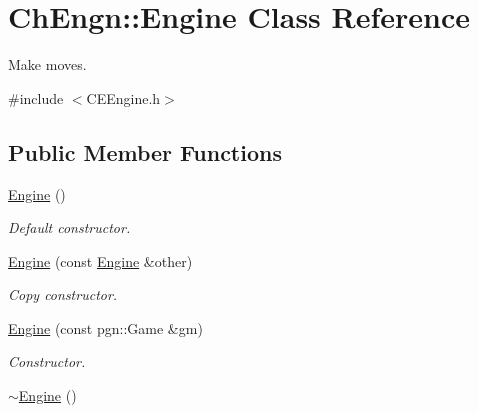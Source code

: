 \hypertarget{classChEngn_1_1Engine}{
\section{ChEngn::Engine Class Reference}
\label{classChEngn_1_1Engine}
}


Make moves.  




{\ttfamily \#include $<$CEEngine.h$>$}

\subsection*{Public Member Functions}
\begin{DoxyCompactItemize}
\item 
\hypertarget{classChEngn_1_1Engine_a2bd4b075e86d94d94f3ea97c680b302e}{
\hyperlink{classChEngn_1_1Engine_a2bd4b075e86d94d94f3ea97c680b302e}{Engine} ()}
\label{classChEngn_1_1Engine_a2bd4b075e86d94d94f3ea97c680b302e}

\begin{DoxyCompactList}\small\item\em Default constructor. \item\end{DoxyCompactList}\item 
\hyperlink{classChEngn_1_1Engine_ab92c015fc819dc2b7c51cccbc7878002}{Engine} (const \hyperlink{classChEngn_1_1Engine}{Engine} \&other)
\begin{DoxyCompactList}\small\item\em Copy constructor. \item\end{DoxyCompactList}\item 
\hyperlink{classChEngn_1_1Engine_a1184e133eae1f7e23bf405302fa9f53c}{Engine} (const pgn::Game \&gm)
\begin{DoxyCompactList}\small\item\em Constructor. \item\end{DoxyCompactList}\item 
\hypertarget{classChEngn_1_1Engine_a8c4cadb1d68d9f3f9ad5ca03d3353a34}{
\hyperlink{classChEngn_1_1Engine_a8c4cadb1d68d9f3f9ad5ca03d3353a34}{$\sim$Engine} ()}
\label{classChEngn_1_1Engine_a8c4cadb1d68d9f3f9ad5ca03d3353a34}


\end{DoxyCompactItemize}
